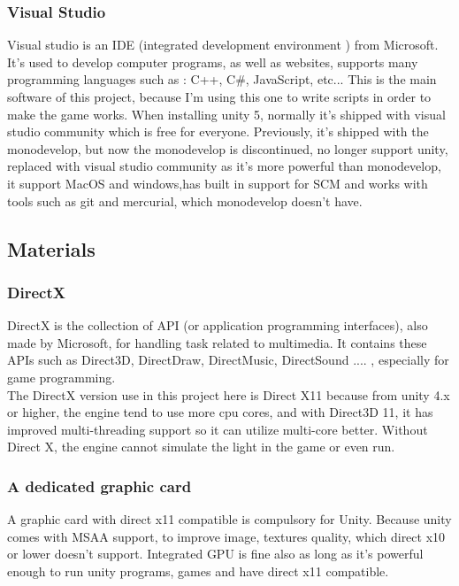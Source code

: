 \documentclass[a4paper, 13pt]{extarticle}
\begin{document}
 		 \subsubsection{Visual Studio}
 		 Visual studio is an IDE (integrated development environment ) from Microsoft. It's used to develop computer programs, as well as websites, supports many programming languages such as : C++, C\#, JavaScript, etc... 
 		 This is the main software of this project, because I'm using this one to write scripts in order to make the game works.
 		 When installing unity 5, normally it's shipped with visual studio community which is free for everyone. Previously, it's shipped with the monodevelop, but now the monodevelop is discontinued, no longer support unity, replaced with visual studio community as it's more powerful than monodevelop, it support MacOS and windows,has built in support for SCM and works with tools such as git and mercurial, which monodevelop doesn't have.  
 		
 		 
 		 
 		 \subsection{Materials}
 		 \subsubsection{DirectX}
 		 DirectX is the collection of API (or  application programming interfaces), also made by Microsoft, for handling task related to multimedia. It contains these APIs such as Direct3D, DirectDraw, DirectMusic, DirectSound .... , especially for game programming. \\[0.15cm] The DirectX version use in this project here is Direct X11 because from unity 4.x or higher, the engine tend to use more cpu cores, and with Direct3D 11, it has improved multi-threading support so it can utilize multi-core better. Without Direct X, the engine cannot simulate the light in the game or even run. 
 		 \subsubsection{A dedicated graphic card}
 		 A graphic card with direct x11 compatible is compulsory for Unity. Because unity comes with MSAA support, to improve image, textures quality, which direct x10 or lower doesn't support. Integrated GPU is fine also as long as it's powerful enough to run unity programs, games and have direct x11 compatible. 
 		 
\end{document}

